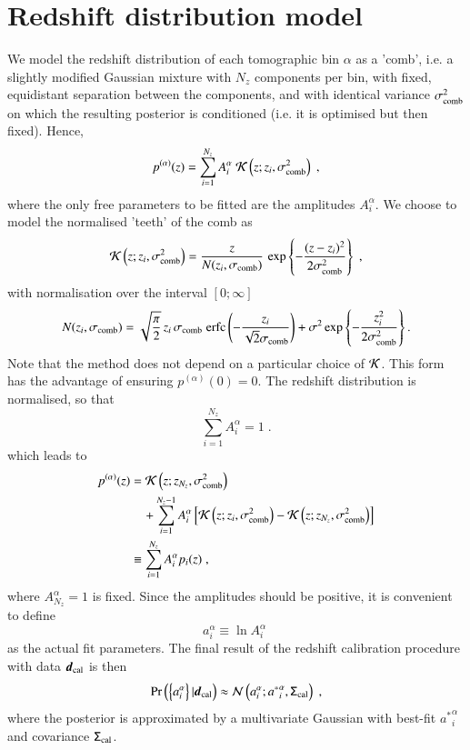 \documentclass{aa}
\newcommand{\eq}[1]{\begin{equation}  #1 \end{equation}}
\newcommand{\eqa}[1]{\begin{align}   #1 \end{align}}
\newcommand{\br}[1]{\left( #1 \right)}
\newcommand{\bc}[1]{\left\{ #1 \right\}}
\newcommand{\bb}[1]{\left[ #1 \right]}
\newcommand{\nn}{\nonumber}
\newcommand{\pr}{{\rm Pr}}
\begin{document}
\section{Redshift distribution model}
\label{sec:comb}
We model the redshift distribution of each tomographic bin $\alpha$ as a 'comb', i.e. a slightly modified Gaussian mixture with $N_z$ components per bin, with fixed, equidistant separation between the components, and with identical variance $\sigma_{\rm comb}^2$ on which the resulting posterior is conditioned (i.e. it is optimised but then fixed). Hence,
\eq{
p^{(\alpha)}(z) = \sum_{i=1}^{N_z} A_i^\alpha\; {\cal K}\br{z; z_i, \sigma_{\rm comb}^2}\;,
}
where the only free parameters to be fitted are the amplitudes $A_i^\alpha$. We choose to model the normalised 'teeth' of the comb as
\eq{
{\cal K} \br{z; z_i, \sigma_{\rm comb}^2} = \frac{z}{N(z_i, \sigma_{\rm comb})}\, \exp \bc{- \frac{(z-z_i)^2}{2 \sigma_{\rm comb}^2} }\;, 
}
with normalisation over the interval $\bb{0;\infty}$
\eq{
N(z_i, \sigma_{\rm comb}) = \sqrt{\frac{\pi}{2}}\, z_i\, \sigma_{\rm comb}\; {\rm erfc} \br{-\frac{z_i}{\sqrt{2} \sigma_{\rm comb}}} + \sigma^2 \exp \bc{-\frac{z_i^2}{2 \sigma_{\rm comb}^2}}.
}
Note that the method does not depend on a particular choice of ${\cal K}$. This form has the advantage of ensuring $p^{(\alpha)}(0)=0$. The redshift distribution is normalised, so that
\eq{
\sum_{i=1}^{N_z} A_i^\alpha = 1\;.
}
which leads to
\eqa{
p^{(\alpha)}(z) &= {\cal K}\br{z; z_{N_z}, \sigma_{\rm comb}^2} \\ \nn
& ~~~~+ \sum_{i=1}^{N_z-1} A_i^\alpha \bb{ {\cal K}\br{z; z_i, \sigma_{\rm comb}^2}  - {\cal K}\br{z; z_{N_z}, \sigma_{\rm comb}^2} } \\ \nn
&\equiv \sum_{i=1}^{N_z} A_i^\alpha p_i(z)\;,
}
where $A_{N_z}^\alpha =1$ is fixed. Since the amplitudes should be positive, it is convenient to define
\eq{
a_i^\alpha \equiv \ln A_i^\alpha\;
}
as the actual fit parameters. The final result of the redshift calibration procedure with data $\boldsymbol{d}_{\rm cal}$ is then
\eq{
\pr \br{ \bc{a_i^\alpha} | \boldsymbol{d}_{\rm cal}} \approx {\cal N}\br{ a_i^\alpha; {a^*}_i^\alpha, \tens{\Sigma}_{\rm cal}}\;,
}
where the posterior is approximated by a multivariate Gaussian with best-fit ${a^*}_i^\alpha$ and covariance $\mathsf{\Sigma}_{\rm cal}$.
\end{document}
